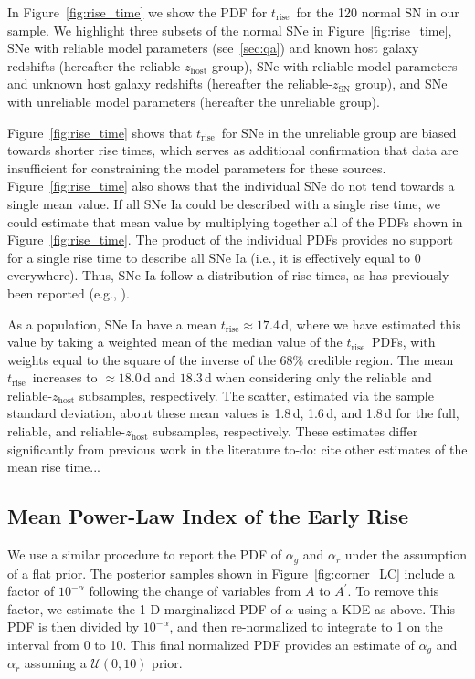 \documentclass[twocolumn]{./aastex63}
\newcommand{\todo}[1]{{\color{magenta} to-do: {#1}}}
\newcommand{\trise}{$t_\mathrm{rise}$}
\begin{document}
In Figure~\ref{fig:rise_time} we show the PDF for \trise\ for the 120 normal
SN in our sample. We highlight three subsets of the normal SNe in
Figure~\ref{fig:rise_time}, SNe with reliable model parameters (see~\ref{sec:qa}) and known host galaxy redshifts (hereafter the
reliable-$z_\mathrm{host}$ group), SNe with reliable model parameters and
unknown host galaxy redshifts (hereafter the reliable-$z_\mathrm{SN}$ group),
and SNe with unreliable model parameters (hereafter the unreliable group). 

Figure~\ref{fig:rise_time} shows that \trise\ for SNe in the unreliable group
are biased towards shorter rise times, which serves as additional
confirmation that data are insufficient for constraining the model parameters
for these sources. Figure~\ref{fig:rise_time} also shows that the individual
SNe do not tend towards a single mean value. If all SNe Ia could be described
with a single rise time, we could estimate that mean value by multiplying
together all of the PDFs shown in Figure~\ref{fig:rise_time}. The product of
the individual PDFs provides no support for a single rise time to describe
all SNe Ia (i.e., it is effectively equal to 0 everywhere). Thus, SNe Ia
follow a distribution of rise times, as has previously been reported (e.g.,
\citealt{Riess99a,Ganeshalingam11,Firth15,Zheng17a}).

As a population, SNe Ia have a mean \trise$ \approx 17.4$\,d, where we have
estimated this value by taking a weighted mean of the median value of the
\trise\ PDFs, with weights equal to the square of the inverse of the 68\%
credible region. The mean \trise\ increases to $\approx 18.0$\,d and
$18.3$\,d when considering only the reliable and reliable-$z_\mathrm{host}$
subsamples, respectively. The scatter, estimated via the sample standard
deviation, about these mean values is 1.8\,d, 1.6\,d, and 1.8\,d for the
full, reliable, and reliable-$z_\mathrm{host}$ subsamples, respectively. These estimates differ significantly from previous work in the literature \todo{cite other estimates of the mean rise time...}

\subsection{Mean Power-Law Index of the Early Rise}

We use a similar procedure to report the PDF of $\alpha_g$ and $\alpha_r$
under the assumption of a flat prior. The posterior samples shown in
Figure~\ref{fig:corner_LC} include a factor of $10^{-\alpha}$ following the
change of variables from $A$ to $A^\prime$. To remove this factor, we
estimate the 1-D marginalized PDF of $\alpha$ using a KDE as above. This PDF
is then divided by $10^{-\alpha}$, and then re-normalized to integrate to 1
on the interval from 0 to 10. This final normalized PDF provides an estimate
of $\alpha_g$ and $\alpha_r$ assuming a $\mathcal{U}(0,10)$ prior.
\end{document}
